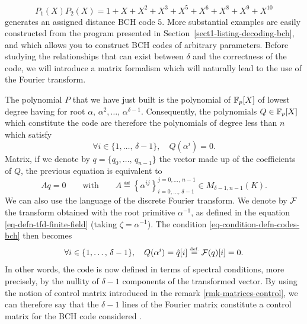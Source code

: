 \begin{exmp}
\begin{equation*}
P_1 (X) P_2 (X) = 1 + X + X^2 + X^3 + X^5 + X^6 + X^8 + X^9 + X^{10}
\end{equation*}
 generates an assigned distance BCH code $ 5 $. More substantial examples are easily constructed from the \Maple{} program presented in Section~\ref{sect1-listing-decoding-bch}, and which allows you to construct BCH codes of arbitrary parameters. Before studying the relationships that can exist between $ \delta $ and the correctness of the code, we will introduce a matrix formalism which will naturally lead to the use of the Fourier transform.
\end{exmp}
 
 
 
The polynomial $ P $ that we have just built is the polynomial of $ \mathbb{F}_p [X] $ of lowest degree having for root $ \alpha, \, \alpha^2, \ldots, \, \alpha^{\delta -1} $. Consequently, the polynomials $ Q \in \mathbb{F}_p [X] $ which constitute the code are therefore the polynomials of degree less than $ n $ which satisfy
\begin{equation}
\label{eq-condition-defn-codes-bch}
\forall i \in \{1, \ldots, \, \delta-1\}, \quad Q (\alpha^i) = 0.
\end{equation}
Matrix, if we denote by $ q = \{q_0, \ldots, \, q_{n-1}\} $ the vector made up of the coefficients of $ Q $, the previous equation is equivalent to
\begin{equation*}
A q = 0 \quad \quad \text{with} \quad \quad A \eqdef \left\{\alpha^{ij} \right\}_{i = 0, \ldots, \, \delta-1}^{j = 0, \ldots, \, n-1} \in M_{\delta-1, n-1} (K).
\end{equation*}
We can also use the language of the discrete Fourier transform. We denote by $ \mathcal{F} $ the transform obtained with the root  primitive $ \alpha^{-1} $, as defined in the equation \eqref{eq-defn-tfd-finite-field} (taking $ \zeta = \alpha^{-1} $). The condition \eqref{eq-condition-defn-codes-bch} then becomes
\begin{equation*}
\forall i \in \{1, \ldots, \, \delta-1\}, \quad Q (\alpha^i) = \hat{q}[i] \stackrel{\mbox{\upshape\tiny def.}}{=} \mathcal{F}(q) [i] = 0.
\end{equation*}
In other words, the code is now defined in terms of spectral conditions, more precisely, by the nullity of $ \delta-1 $ components of the transformed vector. By using the notion of control matrix introduced in the remark \ref{rmk-matrices-control}, we can therefore say that the $ \delta-1 $ lines of the Fourier matrix constitute a control matrix for the BCH code considered .
 
